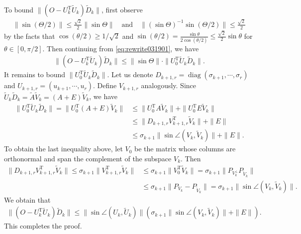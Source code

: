 \documentclass[reqno]{amsart}
\DeclareMathOperator{\diag}{diag}
\newcommand{\T}{\mathrm{T}}
\theoremstyle{plain}
\theoremstyle{definition}
\begin{document}
To bound $ \|(O-{U}_k^\T \widetilde{U}_{k} )\widetilde{D}_{k}\|$, first observe 
\begin{align*}
\|\sin(\Theta/2)\| \le \frac{\sqrt 2}{2}\|\sin\Theta\| \quad \text{and} \quad \|(\sin\Theta)^{-1}\sin(\Theta/2)\| \le \frac{\sqrt 2}{2}
\end{align*}
by the facts that $\cos(\theta/2) \ge 1/\sqrt{2}$ and $\sin(\theta/2)=\frac{\sin\theta}{2\cos(\theta/2)}\le \frac{\sqrt 2}{2}\sin\theta$ for $\theta\in [0,\pi/2]$. Then continuing from \eqref{eq:rewrite031901}, we have
\begin{align*}
\|(O - {U}_k^\T \widetilde{U}_{k}) \widetilde{D}_{k}\| \le \|\sin\Theta\| \cdot \|U_0^\T \widetilde{U}_{k}\widetilde{D}_{k}\|. 
\end{align*}
It remains to bound $\|U_0^\T \widetilde{U}_{k}\widetilde{D}_{k}\|$. Let us denote $D_{k+1,r} = \diag(\sigma_{k+1},\cdots,\sigma_r)$ and $U_{k+1,r} = (u_{k+1},\cdots,u_r)$. Define $V_{k+1,r}$ analogously. Since $ \widetilde{U}_{k}\widetilde{D}_{k} = \widetilde{A} \widetilde{V}_{k} = (A+E)\widetilde{V}_{k}$, we have
\begin{align*}
\|U_0^\T \widetilde{U}_{k}\widetilde{D}_{k}\| = \| U_0^\T(A+E)\widetilde{V}_{k}\| &\le \| U_0^\T A \widetilde{V}_{k}\| +\| U_0^\T E \widetilde{V}_{k}\|\\
&\le \| D_{k+1,r} V_{k+1,r}^\T \widetilde{V}_{k}\| + \|E\| \\
&\le \sigma_{k+1} \| \sin\angle ( V_{k}, \widetilde{ V}_{k})\| + \|E\|.
\end{align*}
To obtain the last inequality above, let $V_0$ be the matrix whose columns are orthonormal and span the complement of the subspace $V_k$. Then
\begin{align*}
\| D_{k+1,r} V_{k+1,r}^\T \widetilde{V}_{k}\| \le \sigma_{k+1} \|V_{k+1,r}^\T \widetilde{V}_{k}\|&\le \sigma_{k+1} \|V_{0}^\T \widetilde{V}_{k}\| = \sigma_{k+1}\|P_{V_k^\perp}P_{\widetilde{V}_{k}} \|\\
&\le \sigma_{k+1} \|P_{V_k} -P_{\widetilde{V}_{k}}\| =\sigma_{k+1}\| \sin\angle ( V_{k}, \widetilde{ V}_{k})\|.
\end{align*}
We obtain that 
\begin{align*}
\|(O - {U}_k^\T \widetilde{U}_{k}) \widetilde{D}_{k}\| \le \|\sin\angle(U_k, \widetilde{U}_{k})\| \left(\sigma_{k+1} \| \sin\angle ( V_{k}, \widetilde{ V}_{k})\| + \|E\| \right). 
\end{align*}
This completes the proof. 
\end{document}
